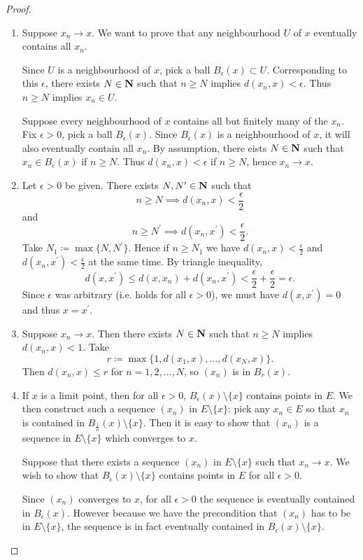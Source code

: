 \begin{proof} \
\begin{enumerate}[label=(\arabic*)]
\item \fbox{$\implies$} Suppose $x_n\to x$. We want to prove that any neighbourhood $U$ of $x$ eventually contains all $x_n$.

Since $U$ is a neighbourhood of $x$, pick a ball $B_\epsilon(x)\subset U$. Corresponding to this $\epsilon$, there exists $N\in\mathbf N$ such that $n\ge N$ implies $d(x_n,x)<\epsilon$. Thus $n\ge N$ implies $x_n\in U$.

\fbox{$\impliedby$} Suppose every neighbourhood of $x$ contains all but finitely many of the $x_n$. Fix $\epsilon>0$, pick a ball $B_\epsilon(x)$. Since $B_\epsilon(x)$ is a neighbourhood of $x$, it will also eventually contain all $x_n$. By assumption, there eists $N\in\mathbf N$ such that $x_n\in B_\epsilon(x)$ if $n\ge N$. Thus $d(x_n,x)<\epsilon$ if $n\ge N$, hence $x_n\to x$.

\item Let $\epsilon>0$ be given. There exists $N,N^\prime\in\mathbf N$ such that
\[n\ge N\implies d(x_n,x)<\frac{\epsilon}{2}\]
and
\[n\ge N^\prime\implies d(x_n,x^\prime)<\frac{\epsilon}{2}.\]
Take $N_1\coloneqq\max\{N,N^\prime\}$. Hence if $n\ge N_1$ we have $d(x_n,x)<\frac{\epsilon}{2}$ and $d(x_n,x^\prime)<\frac{\epsilon}{2}$ at the same time. By triangle inequality,
\[ d(x,x^\prime)\le d(x,x_n)+d(x_n,x^\prime)<\frac{\epsilon}{2}+\frac{\epsilon}{2}=\epsilon.\]
Since $\epsilon$ was arbitrary (i.e. holds for all $\epsilon>0$), we must have $d(x,x^\prime)=0$ and thus $x=x^\prime$.

\item Suppose $x_n\to x$. Then there exists $N\in\mathbf N$ such that $n\ge N$ implies $d(x_n,x)<1$. Take
\[r\coloneqq\max\{1,d(x_1,x),\dots,d(x_N,x)\}.\]
Then $d(x_n,x)\le r$ for $n=1,2,\dots,N$, so $(x_n)$ is in $B_r(x)$.

\item \fbox{$\implies$} If $x$ is a limit point, then for all $\epsilon>0$, $B_\epsilon(x)\setminus\{x\}$ contains points in $E$. We then construct such a sequence $(x_n)$ in $E\setminus\{x\}$: pick any $x_n\in E$ so that $x_n$ is contained in $B_\frac{1}{n}(x)\setminus\{x\}$. Then it is easy to show that $(x_n)$ is a sequence in $E\setminus\{x\}$ which converges to $x$.

\fbox{$\impliedby$} Suppose that there exists a sequence $(x_n)$ in $E\setminus\{x\}$ such that $x_n\to x$. We wish to show that $B_\epsilon(x)\setminus\{x\}$ contains points in $E$ for all $\epsilon>0$.

Since $(x_n)$ converges to $x$, for all $\epsilon>0$ the sequence is eventually contained in $B_\epsilon(x)$. However because we have the precondition that $(x_n)$ has to be in $E\setminus\{x\}$, the sequence is in fact eventually contained in $B_\epsilon(x)\setminus\{x\}$.
\end{enumerate}
\end{proof}

